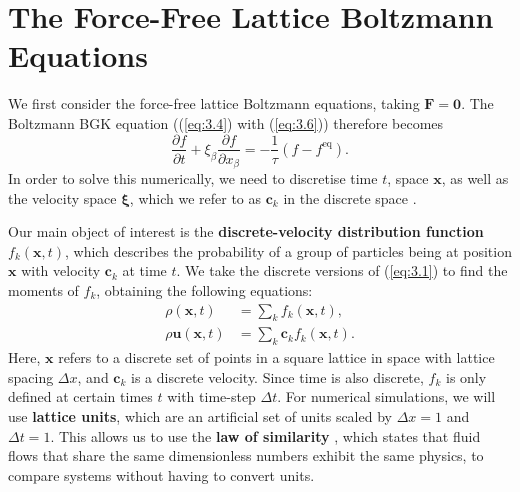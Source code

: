 \documentclass[a4paper, 11pt]{report}
\begin{document}
\section{The Force-Free Lattice Boltzmann Equations} \label{sec:3.2}
We first consider the force-free lattice Boltzmann equations, taking $\mathbf{F} = \mathbf{0}$. The Boltzmann BGK equation ((\ref{eq:3.4}) with (\ref{eq:3.6})) therefore becomes
\begin{equation}
    \frac{\partial f}{\partial t} + \xi_\beta\frac{\partial f}{\partial x_\beta} = -\frac{1}{\tau}(f - f^{\mathrm{eq}}). \label{eq:3.8}
\end{equation}
In order to solve this numerically, we need to discretise time $t$, space $\mathbf{x}$, as well as the velocity space $\bm{\xi}$, which we refer to as $\mathbf{c}_k$ in the discrete space \cite[Sections 3.4-3.5]{lbtextbook}. 

Our main object of interest is the \textbf{discrete-velocity distribution function} $f_k(\mathbf{x},t)$, which describes the probability of a group of particles being at position $\mathbf{x}$ with velocity $\mathbf{c}_k$ at time $t$. We take the discrete versions of (\ref{eq:3.1}) to find the moments of $f_k$, obtaining the following equations:
\begin{subequations} \label{eq:3.9}
\begin{align}
    \rho(\mathbf{x},t) &= \sum_k f_k(\mathbf{x},t), \label{eq:3.9a} \\
    \rho\mathbf{u}(\mathbf{x},t) &= \sum_k \mathbf{c}_k f_k(\mathbf{x},t). \label{eq:3.9b}
\end{align}
\end{subequations}
Here, $\mathbf{x}$ refers to a discrete set of points in a square lattice in space with lattice spacing $\Delta x$, and $\mathbf{c}_k$ is a discrete velocity. Since time is also discrete, $f_k$ is only defined at certain times $t$ with time-step $\Delta t$. For numerical simulations, we will use \textbf{lattice units}, which are an artificial set of units scaled by $\Delta x = 1$ and $\Delta t = 1$. This allows us to use the \textbf{law of similarity} \cite[Section~1.2]{lbtextbook}, which states that fluid flows that share the same dimensionless numbers exhibit the same physics, to compare systems without having to convert units. 

% 
\end{document}
